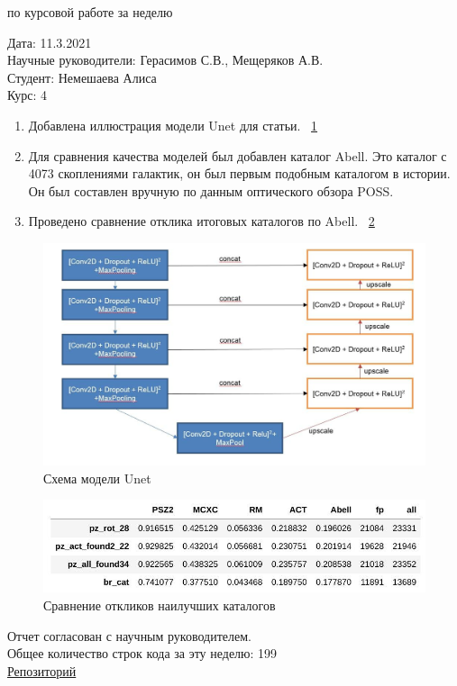 \documentclass{article}
\begin{document}
\begin{center}{ по курсовой работе за неделю\\}\end{center}
Дата: 11.3.2021\\
Научные руководители: Герасимов С.В., Мещеряков А.В.\\
Студент: Немешаева Алиса\\
Курс: 4\\

\renewcommand{\labelitemi}{$\blacksquare$}
\renewcommand\labelitemii{$\square$}
\begin{enumerate}
    \item Добавлена иллюстрация модели Unet для статьи. 
        ~\ref{Fig:Unet}{}\\
    \item Для сравнения качества моделей был добавлен каталог Abell. Это каталог с 4073 скоплениями 
        галактик, он был первым подобным каталогом в истории. Он был составлен вручную по данным 
        оптического обзора POSS.\\
    \item Проведено сравнение отклика итоговых каталогов по Abell.
        ~\ref{Fig:Recall}{}\\
\end{enumerate}




\begin{figure}[h]
\includegraphics[width=0.6\linewidth]{unet}
\caption{Схема модели Unet}
\label{Fig:Unet}
\end{figure}
\begin{figure}[h]
\includegraphics[width=0.6\linewidth]{recall}
\caption{Сравнение откликов наилучших каталогов}
\label{Fig:Recall}
\end{figure}


Отчет согласован с научным руководителем.\\
Общее количество строк кода за эту неделю: 199\\
\href{https://github.com/rt2122/data-segmentation-2}{Репозиторий}\\ 
\end{document}
